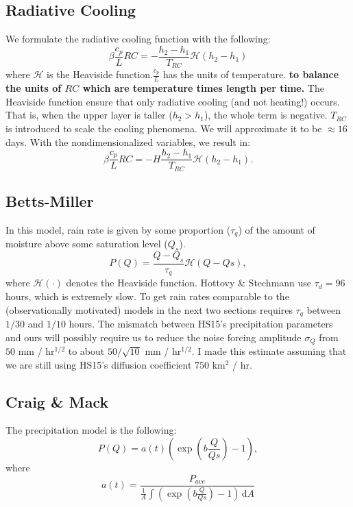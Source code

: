 \documentclass[10pt]{article}
\newcommand{\rmd}{\,\mathrm{d}}
\newcommand{\HH}{\mathcal{H}}
\begin{document}
\subsection{Radiative Cooling}

We formulate the radiative cooling function with the following:
\begin{equation}
\beta \frac{c_p}{L} RC = -\frac{h_2-h_1}{T_{RC}}\HH(h_2-h_1)
\end{equation}
where $\HH$ is the Heaviside function.{\color{blue}$\frac{c_p}{L}$ has the units of temperature.} {\bf to balance the units of $RC$ which are temperature times length per time.} The Heaviside function ensure that only radiative cooling (and not heating!) occurs. 
That is, when the upper layer  is taller ($h_2 > h_1$), the whole term is negative. 
$T_{RC}$ is introduced to scale the cooling phenomena. 
We will approximate it to be $\approx 16$ days. 
{\color{blue} With the nondimensionalized variables, we result in:
	\begin{equation}
	\beta \frac{c_p}{L} RC = -H\frac{h_2-h_1}{T_{RC}}\HH(h_2-h_1).
	\end{equation}
}

\subsection{Betts-Miller}
In this model, rain rate is given by some proportion ($\tau_q$) of the amount of moisture above some saturation level ($Q_s$).
\begin{equation*}
P(Q) = \frac{Q-Q_s}{\tau_q}\HH{(Q-Qs)},
\end{equation*}
where $\HH(\cdot)$ denotes the Heaviside function. 
Hottovy \& Stechmann use $\tau_d=96$ hours, which is extremely slow.
To get rain rates comparable to the (observationally motivated) models in the next two sections requires $\tau_q$ between $1/30$ and $1/10$ hours.
The mismatch between HS15's precipitation parameters and ours will possibly require us to reduce the noise forcing amplitude $\sigma_Q$ from $50$ mm / hr$^{1/2}$ to about $50/\sqrt{10}$ mm / hr$^{1/2}$.
I made this estimate assuming that we are still using HS15's diffusion coefficient $750$ km$^2$ / hr.


\subsection{Craig \& Mack \citep{CM2013}}
The precipitation model is the following:
\begin{equation}
P(Q) = a(t)\left(\exp(b\frac{Q}{Qs})-1\right),
\end{equation}
where 
\begin{equation}
a(t) = \frac{P_{ave}}{\frac{1}{A}\int \left( \exp(b\frac{Q}{Qs})-1 \right)\rmd A}
\end{equation}
\end{document}

